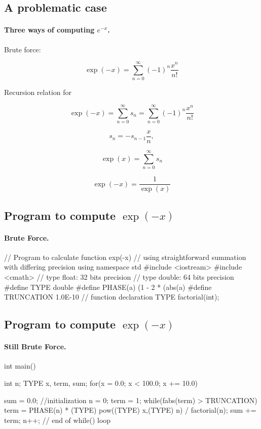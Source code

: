 \documentclass[%
oneside,                 %
final,                   %
10pt]{article}
\begin{document}
{{{{{%
\subsection{A problematic case}


\paragraph{Three ways of computing $e^{-x}$.}
Brute force:

\[\exp{(-x)}=\sum_{n=0}^{\infty}(-1)^n\frac{x^n}{n!}\]

Recursion relation for

\[ \exp{(-x)}=\sum_{n=0}^{\infty}s_n=\sum_{n=0}^{\infty}(-1)^n\frac{x^n}{n!} \]

\[ s_n=-s_{n-1}\frac{x}{n}, \]

\[ \exp{(x)}=\sum_{n=0}^{\infty}s_n \]

\[ \exp{(-x)}=\frac{1}{\exp{(x)}} \]



\subsection{Program to compute $\exp{(-x)}$}


\paragraph{Brute Force.}
\bcppcod
// Program to calculate function exp(-x)
// using straightforward summation with differing  precision
using namespace std
#include <iostream>
#include <cmath>
// type float:  32 bits precision
// type double: 64 bits precision
#define   TYPE          double
#define   PHASE(a)      (1 - 2 * (abs(a) %
#define   TRUNCATION    1.0E-10
// function declaration
TYPE factorial(int);
\ecppcod



\subsection{Program to compute $\exp{(-x)}$}


\paragraph{Still Brute Force.}
\bcppcod
int main()
{
   int   n;
   TYPE  x, term, sum;
   for(x = 0.0; x < 100.0; x += 10.0)  {
     sum  = 0.0;                //initialization
     n    = 0;
     term = 1;
     while(fabs(term) > TRUNCATION)  {
         term =  PHASE(n) * (TYPE) pow((TYPE) x,(TYPE) n)
                / factorial(n);
         sum += term;
         n++;
     }  // end of while() loop
\ecppcod



}}}}}}}
\end{document}
